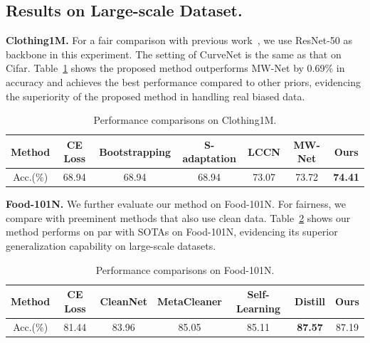 \documentclass[letterpaper]{article} %
\newcommand{\bd}[1]{\textbf{#1}}
\begin{document}
\subsection{Results on Large-scale Dataset.}
\noindent\bd{Clothing1M.}
For a fair comparison with previous work~\cite{shu2019meta}, we use ResNet-50 as backbone in this experiment.
The setting of CurveNet is the same as that on Cifar.
Table~\ref{tab:clothing} shows the proposed method outperforms MW-Net by 0.69\% in accuracy and achieves the best performance compared to other priors, evidencing the superiority of the proposed method in handling real biased data.

\begin{table}[h]
\vspace{-0.3cm}
  \centering
  \begin{adjustbox}{max width=0.47\textwidth}
    \begin{tabular}{c|cccccc}
    \toprule
    Method & CE Loss & Bootstrapping & S-adaptation & LCCN & MW-Net & Ours \\
    \midrule
    Acc.(\%)  & 68.94 & 68.94 & 68.94 & 73.07 & 73.72 & \bd{74.41} \\
    \bottomrule
    \end{tabular}%
    \end{adjustbox}
    \vspace{-0.4cm}
    \caption{Performance comparisons on Clothing1M.}
    \label{tab:clothing}
    \vspace{-0.4cm}
\end{table}%

\noindent\bd{Food-101N.}
We further evaluate our method on Food-101N.
For fairness, we compare with preeminent methods that also use clean data. Table~\ref{tab:food101} shows our method performs on par with SOTAs on Food-101N, evidencing its superior generalization capability on large-scale datasets.
\begin{table}[h]
\vspace{-0.3cm}
  \centering
  \begin{adjustbox}{max width=0.47\textwidth}
    \begin{tabular}{c|cccccc}
    \toprule
    Method & CE Loss & CleanNet & MetaCleaner & Self-Learning & Distill & Ours \\
    \midrule
    Acc.(\%)  & 81.44 & 83.96 & 85.05 & 85.11 & \bd{87.57} & 87.19 \\
    \bottomrule
    \end{tabular}%
    \end{adjustbox}
    \vspace{-0.4cm}
    \caption{Performance comparisons on Food-101N.}
    \vspace{-0.4cm}
  \label{tab:food101}%
\end{table}%
\end{document}
